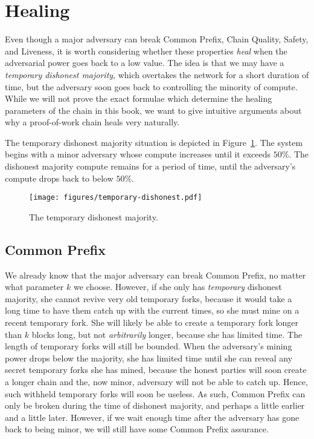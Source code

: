 \section{Healing}

Even though a major adversary can break Common Prefix, Chain Quality, Safety, and Liveness,
it is worth considering whether these properties \emph{heal} when the adversarial power
goes back to a low value. The idea is that we may have a \emph{temporary dishonest majority},
which overtakes the network for a short duration of time, but the adversary soon goes back
to controlling the minority of compute. While we will not prove the exact formulae which
determine the healing parameters of the chain in this book, we want to give intuitive
arguments about why a proof-of-work chain heals very naturally.

The temporary dishonest majority situation is depicted in Figure~\ref{fig.temporary-dishonest}.
The system begins with a minor adversary whose compute increases until it exceeds
$50\%$. The dishonest majority compute remains for a period of time, until the adversary's
compute drops back to below $50\%$.

\begin{figure}[h]
  \centering
  \texttt{[image: figures/temporary-dishonest.pdf]}
  \caption{The temporary dishonest majority.}
  \label{fig.temporary-dishonest}
\end{figure}

\subsection*{Common Prefix}
We already know that the major adversary can break Common Prefix, no matter what parameter
$k$ we choose. However, if she only has \emph{temporary} dishonest majority, she cannot
revive very old temporary forks, because it would take a long time to have them catch up
with the current times, so she must mine on a recent temporary fork. She will likely be
able to create a temporary fork longer than $k$ blocks long, but not \emph{arbitrarily}
longer, because she has limited time. The length of temporary forks will still be bounded.
When the adversary's mining power drops below the majority, she has limited time until
she can reveal any secret temporary forks she has mined, because the honest parties will
soon create a longer chain and the, now minor, adversary will not be able to catch up.
Hence, such withheld temporary forks will soon be useless. As such, Common Prefix can only
be broken during the time of dishonest majority, and perhaps a little earlier and a little
later. However, if we wait enough time after the adversary has gone back to being minor,
we will still have some Common Prefix assurance.

